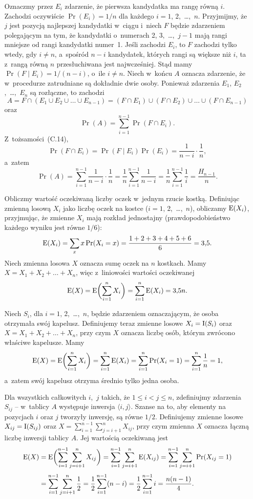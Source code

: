 Oznaczmy przez $E_i$ zdarzenie, że pierwsza kandydatka ma rangę równą $i$. Zachodzi oczywiście $\Pr(E_i)=1/n$ dla każdego $i=1$, 2,~\dots,~$n$. Przyjmijmy, że $j$ jest pozycją najlepszej kandydatki w~ciągu i~niech $F$ będzie zdarzeniem polegającym na tym, że kandydatki o~numerach 2, 3,~\dots,~$j-1$ mają rangi mniejsze od rangi kandydatki numer~1. Jeśli zachodzi $E_i$, to $F$ zachodzi tylko wtedy, gdy $i\ne n$, a~spośród $n-i$ kandydatek, których rangi są większe niż $i$, ta z~rangą równą $n$ przesłuchiwana jest najwcześniej. Stąd mamy $\Pr(F\mid E_i)=1/(n-i)$, o~ile $i\ne n$. Niech w~końcu $A$ oznacza zdarzenie, że w~procedurze  zatrudniane są dokładnie dwie osoby. Ponieważ zdarzenia $E_1$, $E_2$,~\dots,~$E_n$ są rozłączne, to zachodzi
\[
	A = F\cap(E_1\cup E_2\cup\dots\cup E_{n-1}) = (F\cap E_1)\cup(F\cap E_2)\cup\dots\cup(F\cap E_{n-1})
\]
oraz
\[
	\Pr(A) = \sum_{i=1}^{n-1}\Pr(F\cap E_i).
\]
Z~tożsamości~(C.14),
\[
	\Pr(F\cap E_i) = \Pr(F\mid E_i)\Pr(E_i) = \frac{1}{n-i}\cdot\frac{1}{n},
\]
a~zatem
\[
	\Pr(A) = \sum_{i=1}^{n-1}\frac{1}{n-i}\cdot\frac{1}{n} = \frac{1}{n}\sum_{i=1}^{n-1}\frac{1}{n-i} = \frac{1}{n}\sum_{i=1}^{n-1}\frac{1}{i} = \frac{H_{n-1}}{n}.
\]

\exercise %
Obliczmy wartość oczekiwaną liczby oczek w~jednym rzucie kostką. Definiując zmienną losową $X_i$ jako liczbę oczek na  kostce ($i=1$, 2,~\dots,~$n$), obliczamy $\operatorname{E}(X_i)$, przyjmując, że zmienne $X_i$ mają rozkład jednostajny (prawdopodobieństwo każdego wyniku jest równe $1/6$):
\[
	\operatorname{E}(X_i) = \sum_xx\Pr(X_i=x) = \frac{1+2+3+4+5+6}{6} = 3{,}5.
\]
Niech zmienna losowa $X$ oznacza sumę oczek na $n$ kostkach. Mamy $X=X_1+X_2+\dots+X_n$, więc z~liniowości wartości oczekiwanej
\[
	\operatorname{E}(X) = \operatorname{E}\biggl(\sum_{i=1}^nX_i\biggr) = \sum_{i=1}^n\operatorname{E}(X_i) = 3{,}5n.
\]

\exercise %
Niech $S_i$, dla $i=1$, 2,~\dots,~$n$, będzie zdarzeniem oznaczającym, że  osoba otrzymała swój kapelusz. Definiujemy teraz zmienne losowe $X_i=\operatorname{I}(S_i)$ oraz $X=X_1+X_2+\dots+X_n$, przy czym $X$ oznacza liczbę osób, którym zwrócono właściwe kapelusze. Mamy
\[
	\operatorname{E}(X) = \operatorname{E}\biggl(\sum_{i=1}^nX_i\biggr) = \sum_{i=1}^n\operatorname{E}(X_i) = \sum_{i=1}^n\Pr(X_i=1) = \sum_{i=1}^n\frac{1}{n} = 1,
\]
a~zatem swój kapelusz otrzyma średnio tylko jedna osoba.

\exercise %
Dla wszystkich całkowitych $i$,~$j$ takich, że $1\le i<j\le n$, zdefiniujmy zdarzenia $S_{ij}$ -- w~tablicy $A$ występuje inwersja $\langle i,j\rangle$. Szanse na to, aby elementy na pozycjach $i$ oraz $j$ tworzyły inwersję, są równe $1/2$. Definiujemy zmienne losowe $X_{ij}=\operatorname{I}(S_{ij})$ oraz $X=\sum_{i=1}^{n-1}\sum_{j=i+1}^nX_{ij}$, przy czym zmienna $X$ oznacza łączną liczbę inwersji tablicy $A$. Jej wartością oczekiwaną jest
\begin{align*}
	\operatorname{E}(X) &= \operatorname{E}\biggl(\sum_{i=1}^{n-1}\sum_{j=i+1}^nX_{ij}\biggr) = \sum_{i=1}^{n-1}\sum_{j=i+1}^n\operatorname{E}(X_{ij}) = \sum_{i=1}^{n-1}\sum_{j=i+1}^n\Pr(X_{ij}=1) \\[1mm]
	&= \sum_{i=1}^{n-1}\sum_{j=i+1}^n\frac{1}{2} = \frac{1}{2}\sum_{i=1}^{n-1}(n-i) = \frac{1}{2}\sum_{i=1}^{n-1}i = \frac{n(n-1)}{4}.
\end{align*}

